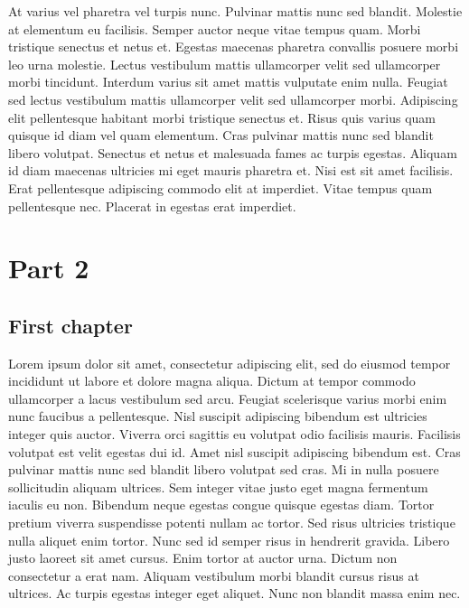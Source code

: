 \documentclass[epsf,a4paper]{book}
\begin{document}
At varius vel pharetra vel turpis nunc. Pulvinar mattis nunc sed blandit. Molestie at elementum eu facilisis. Semper auctor neque vitae tempus quam. Morbi tristique senectus et netus et. Egestas maecenas pharetra convallis posuere morbi leo urna molestie. Lectus vestibulum mattis ullamcorper velit sed ullamcorper morbi tincidunt. Interdum varius sit amet mattis vulputate enim nulla. Feugiat sed lectus vestibulum mattis ullamcorper velit sed ullamcorper morbi. Adipiscing elit pellentesque habitant morbi tristique senectus et. Risus quis varius quam quisque id diam vel quam elementum. Cras pulvinar mattis nunc sed blandit libero volutpat. Senectus et netus et malesuada fames ac turpis egestas. Aliquam id diam maecenas ultricies mi eget mauris pharetra et. Nisi est sit amet facilisis. Erat pellentesque adipiscing commodo elit at imperdiet. Vitae tempus quam pellentesque nec. Placerat in egestas erat imperdiet.

\part{Part 2}

\chapter{First chapter}

Lorem ipsum dolor sit amet, consectetur adipiscing elit, sed do eiusmod tempor incididunt ut labore et dolore magna aliqua. Dictum at tempor commodo ullamcorper a lacus vestibulum sed arcu. Feugiat scelerisque varius morbi enim nunc faucibus a pellentesque. Nisl suscipit adipiscing bibendum est ultricies integer quis auctor. Viverra orci sagittis eu volutpat odio facilisis mauris. Facilisis volutpat est velit egestas dui id. Amet nisl suscipit adipiscing bibendum est. Cras pulvinar mattis nunc sed blandit libero volutpat sed cras. Mi in nulla posuere sollicitudin aliquam ultrices. Sem integer vitae justo eget magna fermentum iaculis eu non. Bibendum neque egestas congue quisque egestas diam. Tortor pretium viverra suspendisse potenti nullam ac tortor. Sed risus ultricies tristique nulla aliquet enim tortor. Nunc sed id semper risus in hendrerit gravida. Libero justo laoreet sit amet cursus. Enim tortor at auctor urna. Dictum non consectetur a erat nam. Aliquam vestibulum morbi blandit cursus risus at ultrices. Ac turpis egestas integer eget aliquet. Nunc non blandit massa enim nec.
\end{document}
